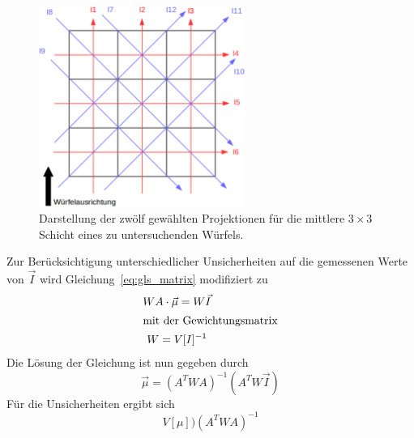 \begin{figure}
  \centering
  \includegraphics[width=0.6\textwidth]{figures/projektionen.pdf}
  \caption{Darstellung der zwölf gewählten Projektionen für die mittlere
  $3\times3$ Schicht eines zu untersuchenden Würfels.}
  \label{fig:projektionen}
\end{figure}

Zur Berücksichtigung unterschiedlicher Unsicherheiten auf die gemessenen Werte
von $\vec{I}$ wird Gleichung~\eqref{eq:gls_matrix} modifiziert zu
\begin{gather}
  WA\cdot\vec{\mu}=W\vec{I} \\
  \intertext{mit der Gewichtungsmatrix}
  W=V[I]^{-1}
\end{gather}
Die Lösung der Gleichung ist nun gegeben durch
\begin{equation}
  \vec{\mu}=\left(A^TWA\right)^{-1}\left(A^TW\vec{I}\right)
\end{equation}
Für die Unsicherheiten ergibt sich
\begin{equation}
  V[\mu])\left(A^TWA\right)^{-1}
\end{equation}
